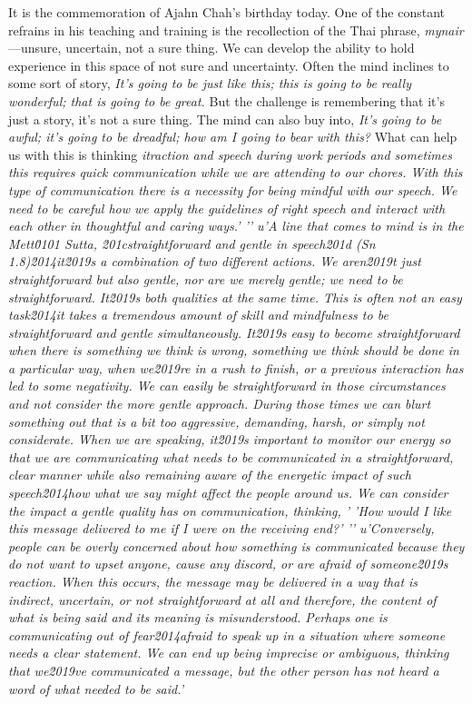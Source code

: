 It is the commemoration of Ajahn Chah's birthday today. One of the 
constant refrains in his teaching and training is the recollection of 
the Thai phrase, \emph{mynair}---unsure, uncertain, not a sure thing. 
We can develop the ability to hold experience in this space of not sure 
and uncertainty. Often the mind inclines to some sort of story, 
\emph{It's going to be just like this; this is going to be really 
wonderful; that is going to be great.} But the challenge is remembering 
that it's just a story, it's not a sure thing. The mind can also buy 
into, \emph{It's going to be awful; it's going to be dreadful; how am I 
going to bear with this?} What can help us with this is thinking 
\emph{itraction and speech during work periods and sometimes this requires quick communication while we are attending to our chores. With this type of communication there is a necessity for being mindful with our speech. We need to be careful how we apply the guidelines of right speech and interact with each other in thoughtful and caring ways.'
'\n'
u'A line that comes to mind is in the Mett\u0101 Sutta, \u201cstraightforward and gentle in speech\u201d (Sn 1.8)\u2014it\u2019s a combination of two different actions. We aren\u2019t just straightforward but also gentle, nor are we merely gentle; we need to be straightforward. It\u2019s both qualities at the same time. This is often not an easy task\u2014it takes a tremendous amount of skill and mindfulness to be straightforward and gentle simultaneously. It\u2019s easy to become straightforward when there is something we think is wrong, something we think should be done in a particular way, when we\u2019re in a rush to finish, or a previous interaction has led to some negativity. We can easily be straightforward in those circumstances and not consider the more gentle approach. During those times we can blurt something out that is a bit too aggressive, demanding, harsh, or simply not considerate. When we are speaking, it\u2019s important to monitor our energy so that we are communicating what needs to be communicated in a straightforward, clear manner while also remaining aware of the energetic impact of such speech\u2014how what we say might affect the people around us. We can consider the impact a gentle quality has on communication, thinking, '
'How would I like this message delivered to me if I were on the receiving end?'
'\n'
u'Conversely, people can be overly concerned about how something is communicated because they do not want to upset anyone, cause any discord, or are afraid of someone\u2019s reaction. When this occurs, the message may be delivered in a way that is indirect, uncertain, or not straightforward at all and therefore, the content of what is being said and its meaning is misunderstood. Perhaps one is communicating out of fear\u2014afraid to speak up in a situation where someone needs a clear statement. We can end up being imprecise or ambiguous, thinking that we\u2019ve communicated a message, but the other person has not heard a word of what needed to be said.'
}

